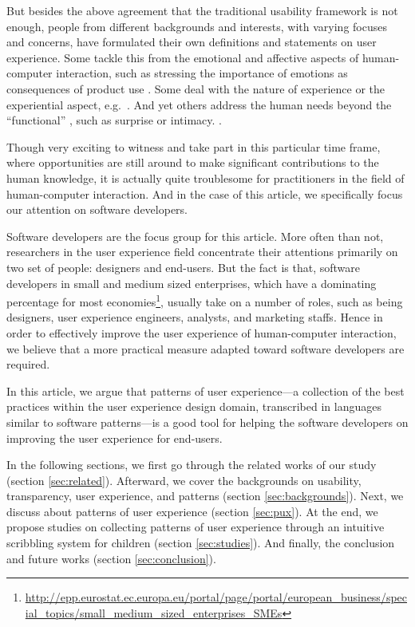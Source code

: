 \documentclass[a4paper,titlepage]{article}
\begin{document}
But besides the above agreement that the traditional usability
framework is not enough, people from different backgrounds and
interests, with varying focuses and concerns, have formulated their
own definitions and statements on user experience. Some tackle this
from the emotional and affective aspects of human-computer
interaction, such as stressing the importance of emotions as
consequences of product use \citep{emotions:desmet}. Some deal with
the nature of experience or the experiential aspect,
e.g.\ \citet{experience:forlizzi}. And yet others address the human
needs beyond the ``functional'' \citep{emotional:norman}, such as
surprise or intimacy. \citep{alternatives:gaver}.

Though very exciting to witness and take part in this particular time
frame, where opportunities are still around to make significant
contributions to the human knowledge, it is actually quite troublesome
for practitioners in the field of human-computer interaction. And in
the case of this article, we specifically focus our attention on
software developers.

Software developers are the focus group for this article. More often
than not, researchers in the user experience field concentrate their
attentions primarily on two set of people: designers and
end-users. But the fact is that, software developers in small and
medium sized enterprises, which have a dominating percentage for most
economies\footnote{\url{http://epp.eurostat.ec.europa.eu/portal/page/portal/european_business/special_topics/small_medium_sized_enterprises_SMEs}},
usually take on a number of roles, such as being designers, user
experience engineers, analysts, and marketing staffs. Hence in order
to effectively improve the user experience of human-computer
interaction, we believe that a more practical measure adapted toward
software developers are required.

In this article, we argue that patterns of user experience---a
collection of the best practices within the user experience design
domain, transcribed in languages similar to software patterns---is a
good tool for helping the software developers on improving the user
experience for end-users.

In the following sections, we first go through the related works of
our study (section \ref{sec:related}). Afterward, we cover the
backgrounds on usability, transparency, user experience, and patterns
(section \ref{sec:backgrounds}). Next, we discuss about patterns of
user experience (section \ref{sec:pux}). At the end, we propose
studies on collecting patterns of user experience through an intuitive
scribbling system for children (section \ref{sec:studies}). And finally,
the conclusion and future works (section \ref{sec:conclusion}).
\end{document}
